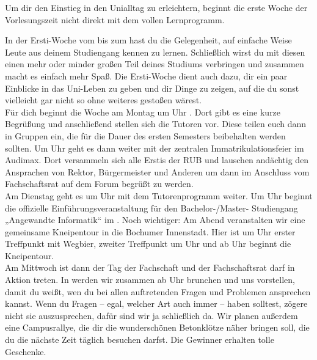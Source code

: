 

Um dir den Einstieg in den Unialltag zu erleichtern, beginnt die erste Woche der Vorlesungszeit nicht direkt mit dem vollen Lernprogramm.

In der Ersti-Woche vom \makeDate{\firstDayOfFreshmenweek} bis zum \makeDate{\lastDayOfFreshmenweek} hast du die Gelegenheit, auf einfache Weise Leute aus deinem Studiengang kennen zu lernen. Schließlich wirst du mit diesen einen mehr oder minder großen Teil deines Studiums verbringen und zusammen macht es einfach mehr Spaß. Die Ersti-Woche dient auch dazu, dir ein paar Einblicke in das Uni-Leben zu geben und dir Dinge zu zeigen, auf die du sonst vielleicht gar nicht so ohne weiteres gestoßen wärest.\\

Für dich beginnt die Woche am Montag um \initialSegregationMeetingTime Uhr \initialSegregationMeetingPoint . Dort gibt es eine kurze Begrüßung und anschließend stellen sich die Tutoren vor. Diese teilen euch dann in Gruppen ein, die für die Dauer des ersten Semesters beibehalten werden sollten. Um \AudimaxAddressingStartingTime Uhr geht es dann weiter mit der zentralen Immatrikulationsfeier im Audimax. Dort versammeln sich alle Erstis der RUB und lauschen andächtig den Ansprachen von Rektor, Bürgermeister und Anderen um dann im Anschluss vom Fachschaftsrat auf dem Forum begrüßt zu werden.\\
Am Dienstag geht es um \startingTimeOfTutorProgram Uhr mit dem Tutorenprogramm weiter. Um \startingTimeOfOfficialWelcomingEvent Uhr beginnt die offizielle Einführungsveranstaltung für den Bachelor-/Master- Studiengang „Angewandte Informatik“ im \roomIntroductoryEvent. Noch wichtiger: Am Abend veranstalten wir eine gemeinsame Kneipentour in die Bochumer Innenstadt. Hier ist um \firstMeetingTimePubCrawl Uhr erster Treffpunkt \PubcrawlMeetingPointOne mit Wegbier, zweiter Treffpunkt um \secondMeetingTimePubCrawl Uhr \PubcrawlMeetingPointTwo und ab \startingTimePubCrawl Uhr beginnt \PubcrawlStartingPub die Kneipentour.\\

Am Mittwoch ist dann der Tag der Fachschaft und der Fachschaftsrat darf in Aktion treten. In \roomFreshmenBrunch werden wir zusammen ab \startingTimeFreshmenBrunch Uhr brunchen und uns vorstellen, damit du weißt, wen du bei allen auftretenden Fragen und Problemen ansprechen kannst. Wenn du Fragen – egal, welcher Art auch immer – haben solltest, zögere nicht sie auszusprechen, dafür sind wir ja schließlich da. Wir planen außerdem eine Campusrallye, die dir die wunderschönen Betonklötze näher bringen soll, die du die nächste Zeit täglich besuchen darfst. Die Gewinner erhalten tolle Geschenke.\\

